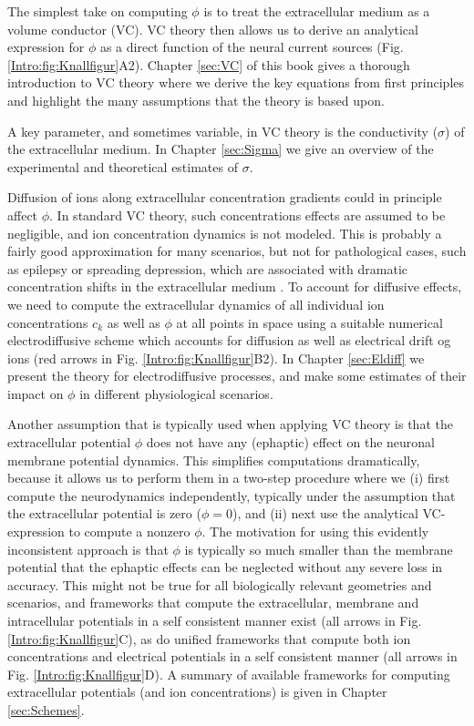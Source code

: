 The simplest take on computing $\phi$ is to treat the extracellular medium as a volume conductor (VC). VC theory then allows us to derive an analytical expression for $\phi$ as a direct function of the neural current sources (Fig. \ref{Intro:fig:Knallfigur}A2). Chapter \ref{sec:VC} of this book gives a thorough introduction to VC theory where we derive the key equations from first principles and highlight the many assumptions that the theory is based upon.

A key parameter, and sometimes variable, in VC theory is the conductivity ($\sigma$) of the extracellular medium. In Chapter \ref{sec:Sigma} we give an overview of the experimental and theoretical estimates of $\sigma$. 

Diffusion of ions along extracellular concentration gradients could in principle affect $\phi$. In standard VC theory, such concentrations effects are assumed to be negligible, and ion concentration dynamics is not modeled. This is probably a fairly good approximation for many scenarios, but not for pathological cases, such as epilepsy or spreading depression, which are associated with dramatic concentration shifts in the extracellular medium \cite{Somjen2001, Frohlich2008, Zandt2015review, Ayata2015}. To account for diffusive effects, we need to compute the extracellular dynamics of all individual ion concentrations $c_k$ as well as $\phi$ at all points in space using a suitable numerical electrodiffusive scheme which accounts for diffusion as well as electrical drift og ions (red arrows in Fig. \ref{Intro:fig:Knallfigur}B2). In Chapter \ref{sec:Eldiff} we present the theory for electrodiffusive processes, and make some estimates of their impact on $\phi$ in different physiological scenarios. 

Another assumption that is typically used when applying VC theory is that the extracellular potential $\phi$ does not have any (ephaptic) effect on the neuronal membrane potential dynamics. This simplifies computations dramatically, because it allows us to perform them in a two-step procedure where we (i) first compute the neurodynamics independently, typically under the assumption that the extracellular potential is zero ($\phi = 0$), and (ii) next use the analytical VC-expression to compute a nonzero $\phi$. The motivation for using this evidently inconsistent approach is that $\phi$ is typically so much smaller than the membrane potential that the ephaptic effects can be neglected without any severe loss in accuracy. This might not be true for all biologically relevant geometries and scenarios, and frameworks that compute the extracellular, membrane and intracellular potentials in a self consistent manner exist (all arrows in Fig. \ref{Intro:fig:Knallfigur}C), as do unified frameworks that compute both ion concentrations and electrical potentials in a self consistent manner (all arrows in Fig. \ref{Intro:fig:Knallfigur}D). A summary of available frameworks for computing extracellular potentials (and ion concentrations) is given in Chapter \ref{sec:Schemes}.


